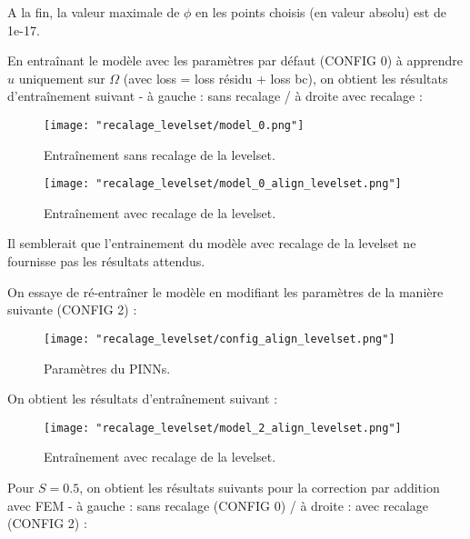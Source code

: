\begin{Obs}
	A la fin, la valeur maximale de $\phi$ en les points choisis (en valeur absolu) est de 1e-17.
\end{Obs}

En entraînant le modèle avec les paramètres par défaut (CONFIG 0) à apprendre $u$ uniquement sur $\Omega$ (avec loss = loss résidu + loss bc), on obtient les résultats d'entraînement suivant - à gauche : sans recalage / à droite avec recalage :

\begin{minipage}{0.48\linewidth}
	\begin{figure}[H]
		\centering
		\texttt{[image: "recalage\_levelset/model\_0.png"]}
		\caption{Entraînement sans recalage de la levelset.}
	\end{figure}
\end{minipage}
\begin{minipage}{0.48\linewidth}
	\begin{figure}[H]
		\centering
		\texttt{[image: "recalage\_levelset/model\_0\_align\_levelset.png"]}
		\caption{Entraînement avec recalage de la levelset.}
	\end{figure}
\end{minipage}

\begin{Obs}
	Il semblerait que l'entrainement du modèle avec recalage de la levelset ne fournisse pas les résultats attendus.
\end{Obs}

On essaye de ré-entraîner le modèle en modifiant les paramètres de la manière suivante (CONFIG 2) :

\begin{figure}[H]
	\centering
	\texttt{[image: "recalage\_levelset/config\_align\_levelset.png"]}
	\caption{Paramètres du PINNs.}
\end{figure}

On obtient les résultats d'entraînement suivant :

\begin{figure}[H]
	\centering
	\texttt{[image: "recalage\_levelset/model\_2\_align\_levelset.png"]}
	\caption{Entraînement avec recalage de la levelset.}
\end{figure}

Pour $S=0.5$, on obtient les résultats suivants pour la correction par addition avec FEM - à gauche : sans recalage (CONFIG 0) / à droite : avec recalage (CONFIG 2) :

